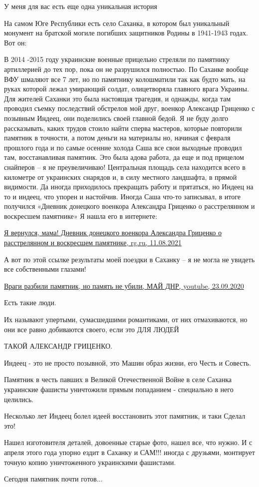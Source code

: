 У меня для вас есть еще одна уникальная история

На самом Юге Республики есть село Саханка, в котором был уникальный монумент на
братской могиле погибших защитников Родины в 1941-1943 годах. Вот он:

В 2014 -2015 году украинские военные прицельно стреляли по памятнику
артиллерией до тех пор, пока он не разрушился полностью. По Саханке вообще ВФУ
шмаляют все 7 лет, но по памятнику колошматили так как будто мать, на руках
которой лежал умирающий солдат, олицетворяла главного врага Украины. Для
жителей Саханки это была настоящая трагедия, и однажды, когда там проводил
съемку последствий обстрелов мой друг, военкор Александр Гриценко с позывным
Индеец, они поделились своей главной бедой. Я не буду долго рассказывать, каких
трудов стоило найти сперва мастеров, которые повторили памятник в точности, а
потом деньги на материалы но, начиная с февраля прошлого года и по самые
осенние холода Саша все свои выходные проводил там, восстанавливая памятник.
Это была адова работа, да еще и под прицелом снайперов – я не преувеличиваю!
Центральная площадь села находится всего в километре от украинских снарядов и,
в силу местного ландшафта, в прямой видимости. Да иногда приходилось прекращать
работу и прятаться, но Индеец на то и индеец, что упорен и настойчив. Иногда
Саша что-то записывал, в итоге получился «Дневник донецкого военкора Александра
Гриценко о расстрелянном и воскресшем памятнике» Я нашла его в интернете:

\href{https://rg.ru/2021/08/11/dnevnik-doneckogo-voenkora-aleksandra-gricenko-o-rasstreliannom-i-voskresshem-pamiatnike.html}{%
Я вернулся, мама!  Дневник донецкого военкора Александра Гриценко о расстрелянном и воскресшем памятнике, %
rg.ru, 11.08.2021%
}

А вот по этой ссылке результаты моей поездки в Саханку – я не могла не увидеть
все собственными глазами!

\href{https://youtu.be/3v7-lnzUc1k}{%
Враги разбили памятник, но память не убили, МАЙ ДНР, youtube, 23.09.2020%
}

\begin{multicols}{2} %
Есть такие люди. 

Их называют упертыми, сумасшедшими романтиками, от них отмахиваются, но они все
равно добиваются своего, если это ДЛЯ ЛЮДЕЙ

ТАКОЙ АЛЕКСАНДР ГРИЦЕНКО. 

Индеец - это не просто позывной, это Машин образ жизни, его Честь и Совесть.

Памятник в честь павших в Великой Отечественной Войне в селе Саханка украинские
фашисты уничтожили прямым попаданием - специально в него целились. 

Несколько лет Индеец болел идеей восстановить этот памятник, и таки Сделал это!

Нашел изготовителя деталей, довоенные старые фото, нашел все, что нужно. И с
апреля этого года упорно ездит в Саханку и САМ!!! иногда с друзьями, монтирует
точную копию уничтоженного украинскими фашистами. 

Сегодня памятник почти готов...
\end{multicols} %

